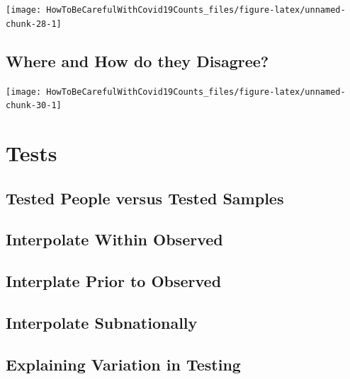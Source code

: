 \documentclass[
]{book}
\begin{document}
\begin{center}\texttt{[image: HowToBeCarefulWithCovid19Counts\_files/figure-latex/unnamed-chunk-28-1]} \end{center}

\hypertarget{where-and-how-do-they-disagree}{%
\section{Where and How do they Disagree?}\label{where-and-how-do-they-disagree}}

\begin{center}\texttt{[image: HowToBeCarefulWithCovid19Counts\_files/figure-latex/unnamed-chunk-30-1]} \end{center}

\hypertarget{htmlwidget-3bd029832caec1d27062}{}

\hypertarget{htmlwidget-49e42409f2e74eff5605}{}

\hypertarget{tests}{%
\chapter{Tests}\label{tests}}

\hypertarget{tested-people-versus-tested-samples}{%
\section{Tested People versus Tested Samples}\label{tested-people-versus-tested-samples}}

\hypertarget{interpolate-within-observed}{%
\section{Interpolate Within Observed}\label{interpolate-within-observed}}

\hypertarget{interplate-prior-to-observed}{%
\section{Interplate Prior to Observed}\label{interplate-prior-to-observed}}

\hypertarget{interpolate-subnationally}{%
\section{Interpolate Subnationally}\label{interpolate-subnationally}}

\hypertarget{explaining-variation-in-testing}{%
\section{Explaining Variation in Testing}\label{explaining-variation-in-testing}}
\end{document}
